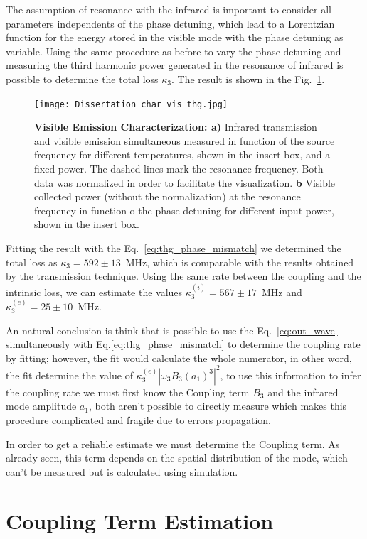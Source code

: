 The assumption of resonance with the infrared is important to consider all parameters independents of the phase detuning, which lead to a Lorentzian function for the energy stored in the visible mode with the phase detuning as variable. Using the same procedure as before to vary the phase detuning and measuring the third harmonic power generated in the resonance of infrared is possible to determine the total loss $\kappa_3$. The result is shown in the Fig.~\ref{fig:mode_char_thg}.
\begin{figure}[!h]
    \centering
    \texttt{[image: Dissertation\_char\_vis\_thg.jpg]}
    \caption{\textbf{Visible Emission Characterization: a)} Infrared transmission and visible emission simultaneous measured in function of the source frequency for different temperatures, shown in the insert box, and a fixed power. The dashed lines mark the resonance frequency. Both data was normalized in order to facilitate the visualization. \textbf{b} Visible collected power (without the normalization) at the resonance frequency in function o the phase detuning for different input power,  shown in the insert box.}
    \label{fig:mode_char_thg}
\end{figure}

Fitting the result with the Eq.~\ref{eq:thg_phase_mismatch} we determined the total loss as $\kappa_3 = 592\pm13$~MHz, which is comparable with the results obtained by the transmission technique. Using the same rate between the coupling and the intrinsic loss, we can estimate the values $\kappa_3^{(i)} = 567\pm17$~MHz and $\kappa_3^{(e)}=25\pm10$~MHz. 

An natural conclusion is think that is possible to use the Eq.~\ref{eq:out_wave} simultaneously with Eq.\ref{eq:thg_phase_mismatch} to determine the coupling rate by fitting; however, the fit would calculate the whole numerator, in other word, the fit determine the value of $\kappa_3^{(e)}|\omega_3 B_3 (a_1)^3|^2$, to use this information to infer the coupling rate we must first know the Coupling term $B_3$ and the infrared mode amplitude $a_1$, both aren't possible to directly measure which makes this procedure complicated and fragile due to errors propagation. 

In order to get a reliable estimate we must determine the Coupling term. As already seen, this term depends on the spatial distribution of the mode, which can't be measured but is calculated using simulation.

\section{Coupling Term Estimation}

